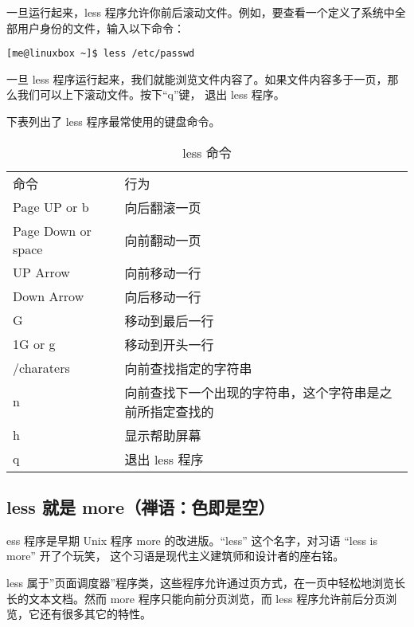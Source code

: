 \par 一旦运行起来，less 程序允许你前后滚动文件。例如，要查看一个定义了系统中全部用户身份的文件，输入以下命令：
\begin{lstlisting}
[me@linuxbox ~]$ less /etc/passwd
\end{lstlisting}

\par 一旦 less 程序运行起来，我们就能浏览文件内容了。如果文件内容多于一页，那么我们可以上下滚动文件。按下“q”键， 退出 less 程序。

\par 下表列出了 less 程序最常使用的键盘命令。
\begin{table}[ht!]
\caption{less 命令}
\label{table3}
\centering
\begin{tabular}{p{4cm}p{11cm}}
\rowcolor[gray]{0.8}
命令 & 行为\\

Page UP or b &	向后翻滚一页 \\
Page Down or space & 向前翻动一页 \\
UP Arrow & 向前移动一行\\
Down Arrow &	向后移动一行\\
G	& 移动到最后一行\\
1G or g	& 移动到开头一行\\
/charaters	& 向前查找指定的字符串\\
n	& 向前查找下一个出现的字符串，这个字符串是之前所指定查找的\\
h	& 显示帮助屏幕\\
q	& 退出 less 程序\\
\bottomrule
\end{tabular}
\end{table}

\fboxrule=6pt \fboxsep=4pt
\begin{colorboxed}[boxcolor=lightgray,bgcolor=white]
\subsection{less 就是 more（禅语：色即是空）}

ess 程序是早期 Unix 程序 more 的改进版。“less” 这个名字，对习语 “less is more” 开了个玩笑， 这个习语是现代主义建筑师和设计者的座右铭。

\par less 属于”页面调度器”程序类，这些程序允许通过页方式，在一页中轻松地浏览长长的文本文档。然而 more 程序只能向前分页浏览，而 less 程序允许前后分页浏览，它还有很多其它的特性。
\end{colorboxed}


